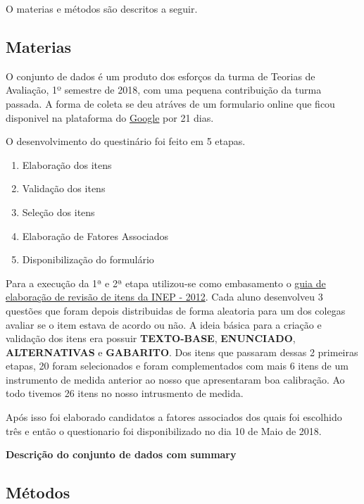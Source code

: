 \documentclass[]{article}
\providecommand{\tightlist}{%
  \setlength{\itemsep}{0pt}\setlength{\parskip}{0pt}}
\begin{document}
O materias e métodos são descritos a seguir.

\subsection{Materias}\label{materias}

O conjunto de dados é um produto dos esforços da turma de Teorias de
Avaliação, 1º semestre de 2018, com uma pequena contribuição da turma
passada. A forma de coleta se deu atráves de um formulario online que
ficou disponivel na plataforma do
\href{https://www.google.com/forms/about/}{Google} por 21 dias.

O desenvolvimento do questinário foi feito em 5 etapas.

\begin{enumerate}
\def\labelenumi{\arabic{enumi}.}
\tightlist
\item
  Elaboração dos itens
\item
  Validação dos itens
\item
  Seleção dos itens
\item
  Elaboração de Fatores Associados
\item
  Disponibilização do formulário
\end{enumerate}

Para a execução da 1ª e 2ª etapa utilizou-se como embasamento o
\href{www.ufpr.br/~aanjos/CE095/guia_elaboracao_revisao_itens_2012_INEP.pdf}{guia
de elaboração de revisão de itens da INEP - 2012}. Cada aluno
desenvolveu 3 questões que foram depois distribuidas de forma aleatoria
para um dos colegas avaliar se o item estava de acordo ou não. A ideia
básica para a criação e validação dos itens era possuir
\textbf{TEXTO-BASE}, \textbf{ENUNCIADO}, \textbf{ALTERNATIVAS} e
\textbf{GABARITO}. Dos itens que passaram dessas 2 primeiras etapas, 20
foram selecionados e foram complementados com mais 6 itens de um
instrumento de medida anterior ao nosso que apresentaram boa calibração.
Ao todo tivemos 26 itens no nosso intrusmento de medida.

Após isso foi elaborado candidatos a fatores associados dos quais foi
escolhido três e então o questionario foi disponibilizado no dia 10 de
Maio de 2018.

\textbf{Descrição do conjunto de dados com summary}

\subsection{Métodos}\label{metodos}
\end{document}
